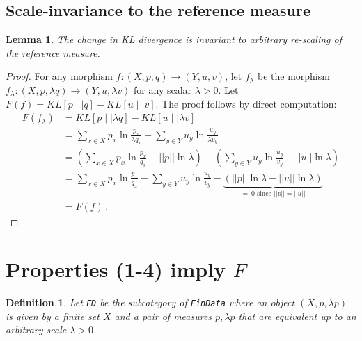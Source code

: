 \documentclass{article}
\newtheorem{definition}{Definition}
\newtheorem{lemma}{Lemma}
\begin{document}
\subsection{Scale-invariance to the reference measure}
\begin{lemma}
    The change in KL divergence is invariant to arbitrary re-scaling of the reference measure.
\end{lemma}
\begin{proof}
For any morphism $f:(X, p, q) \rightarrow (Y, u, v)$, let $f_\lambda$ be the morphism $f_\lambda:(X, p, \lambda q) \rightarrow (Y, u, \lambda v)$ for any scalar $\lambda > 0$. Let $F(f) = KL[p \mid\mid q] - KL[u \mid\mid v]$. The proof follows by direct computation:
\begin{align*}
    F(f_\lambda) &= KL[p \mid\mid \lambda q] - KL[u \mid\mid \lambda v]\\
    &= \sum_{x\in X} p_x \ln \frac{p_x}{\lambda q_x} - \sum_{y\in Y} u_y \ln \frac{u_y}{\lambda v_y}\\
    &= \left(\sum_{x\in X} p_x \ln \frac{p_x}{q_x} - ||p||\ln\lambda\right) - \left(\sum_{y\in Y} u_y \ln \frac{u_y}{ v_y} - ||u||\ln\lambda\right)\\
    &= \sum_{x\in X} p_x \ln \frac{p_x}{q_x} - \sum_{y\in Y} u_y \ln \frac{u_y}{v_y} - \underbrace{\left(||p||\ln\lambda - ||u||\ln\lambda\right)}_{= \ 0 \text{ since } ||p|| = ||u||}\\
    &= F(f)\,.
\end{align*}
\end{proof}

\section{Properties (1-4) imply $F$}

\begin{definition}
    Let \texttt{FD} be the subcategory of \texttt{FinData} where an object $(X, p, \lambda p)$ is given by a finite set $X$ and a pair of measures $p, \lambda p$ that are equivalent up to an arbitrary scale $\lambda > 0$.
\end{definition}
\end{document}
